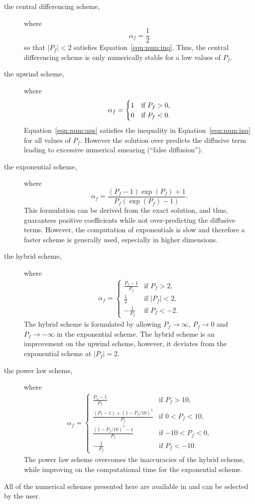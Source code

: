 \begin{description}
%
%
%
\item[the central differencing scheme,] where
\begin{equation}
\alpha_f = \frac{1}{2}
\label{eqn:num:cds}
\end{equation}
so that $|P_f|<2$ satisfies Equation~\eqref{eqn:num:inq}. Thus, the
central differencing scheme is only numerically stable for a low
values of $P_f$.
%
%
%
\item[the upwind scheme,] where
\begin{eqnarray}
\alpha_f = \begin{cases}
1 & \text{if $P_f > 0$,} \\
0 & \text{if $ P_f < 0$.}
\end{cases}
\label{eqn:num:ups}
\end{eqnarray}
Equation~\eqref{eqn:num:ups} satisfies the inequality in
Equation~\eqref{eqn:num:inq} for all values of $P_f$.  However the
solution over predicts the diffusive term leading to excessive
numerical smearing (``false diffusion'').
%
%
%
\item[the exponential scheme,] where
\begin{equation}
\alpha_f = \frac{(P_f-1)\exp{(P_f)}+1}{P_f(\exp{(P_f)}-1)}.
\label{eqn:num:exs}
\end{equation}
This formulation can be derived from the exact solution, and thus,
guarantees positive coefficients while not over-predicting the
diffusive terms. However, the computation of exponentials is slow and
therefore a faster scheme is generally used, especially in higher
dimensions.
%
%
%
\item[the hybrid scheme,] where
\begin{eqnarray}
\alpha_f = 
\begin{cases}
    \frac{P_f-1}{P_f} & \text{if $P_f > 2$,} \\
    \frac{1}{2} & \text{if $|P_f| < 2$,} \\
    -\frac{1}{P_f} & \text{if $P_f < -2$.}
\end{cases}
\label{eqn:num:hys}
\end{eqnarray}
The hybrid scheme is formulated by allowing $P_f \rightarrow \infty$,
$P_f \rightarrow 0$ and $P_f \rightarrow -\infty$ in the exponential
scheme.  The hybrid scheme is an improvement on the upwind scheme,
however, it deviates from the exponential scheme at $|P_f|=2$.
%
%
%
\item[the power law scheme,] where
\begin{eqnarray}
\alpha_f = 
\begin{cases}
    \frac{P_f-1}{P_f} & \text{if $P_f > 10$,} \\
    \frac{(P_f-1)+(1-P_f/10)^5}{P_f} & \text{if $0 < P_f < 10$,} \\
    \frac{(1-P_f/10)^5 - 1}{P_f} & \text{if $-10 < P_f < 0$,} \\
    -\frac{1}{P_f} & \text{if $P_f < -10$.}
\end{cases}
\label{eqn:num:pls}
\end{eqnarray}
The power law scheme overcomes the inaccuracies of the hybrid scheme,
while improving on the computational time for the exponential scheme.
\end{description}

All of the numerical schemes presented here are available in \FiPy{}
and can be selected by the user.







